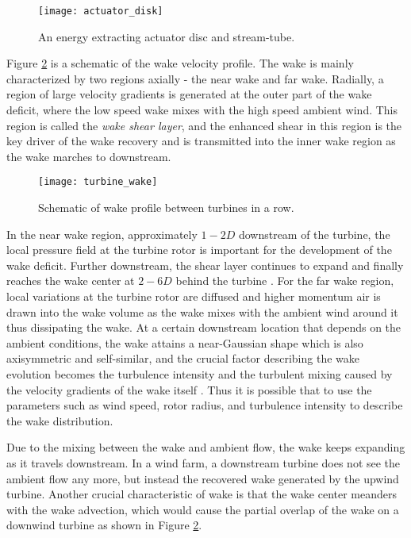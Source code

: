 \documentclass{umthesis}
\begin{document}
\begin{figure}
  \centering
  \texttt{[image: actuator\_disk]}
  \caption{An energy extracting actuator disc and stream-tube.}\label{fig:actuator_disk}
\end{figure}

Figure \ref{fig:wake} is a schematic of the wake velocity profile. The wake is mainly characterized by two regions axially - the near wake and far wake. Radially, a region of large velocity gradients is generated at the outer part of the wake deficit, where the low speed wake mixes with the high speed ambient wind. This region is called the \textit{wake shear layer}, and the enhanced shear in this region is the key driver of the wake recovery and is transmitted into the inner wake region as the wake marches to downstream.

\begin{figure}
  \centering
  \texttt{[image: turbine\_wake]}
  \caption{Schematic of wake profile between turbines in a row.}\label{fig:wake}
\end{figure}


In the near wake region, approximately $1-2D$ downstream of the turbine, the local pressure field at the turbine rotor is important for the development of the wake deficit. Further downstream, the shear layer continues to expand and finally reaches the wake center at $2-6D$ behind the turbine \cite{Aerodynamics}. For the far wake region, local variations at the turbine rotor are diffused and higher momentum air is drawn into the wake volume as the wake mixes with the ambient wind around it thus dissipating the wake. At a certain downstream location that depends on the ambient conditions, the wake attains a near-Gaussian shape which is also axisymmetric and self-similar, and the crucial factor describing the wake evolution becomes the turbulence intensity and the turbulent mixing caused by the velocity gradients of the wake itself \cite{Meteorological_controls}. Thus it is possible that to use the parameters such as wind speed, rotor radius, and turbulence intensity to describe the wake distribution.

Due to the mixing between the wake and ambient flow, the wake keeps expanding as it travels downstream. In a wind farm, a downstream turbine does not see the ambient flow any more, but instead the recovered wake generated by the upwind turbine. Another crucial characteristic of wake is that the wake center meanders with the wake advection, which would cause the partial overlap of the wake on a downwind turbine as shown in Figure \ref{fig:wake}.
\end{document}
